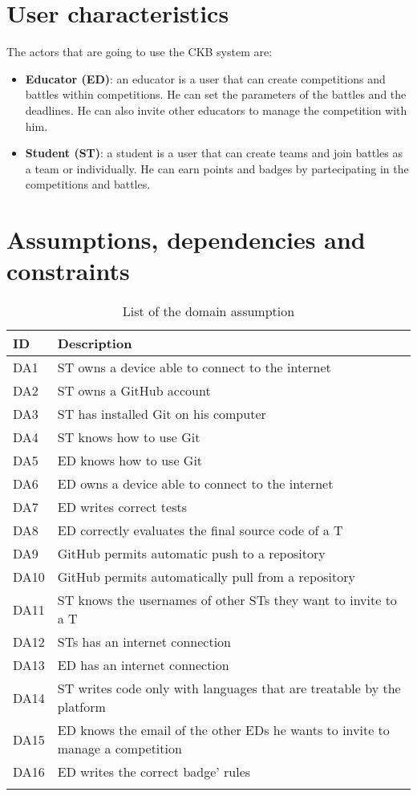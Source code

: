 \newpage

\section{User characteristics}
\label{s:User_characteristics}%

The actors that are going to use the CKB system are:
\begin{itemize}
  \item \textbf{Educator (ED)}: an educator is a user that can create competitions and battles within competitions. He can set the parameters of the battles and the deadlines. He can also invite other educators to manage the competition with him.
  \item \textbf{Student (ST)}: a student is a user that can create teams and join battles as a team or individually. He can earn points and badges by partecipating in the competitions and battles.
\end{itemize}


\section{Assumptions, dependencies and constraints}
\label{s:Assumptions_dependencies_and_constraints}%

\begin{longtable}{|l|l|}
  \hline
  \textbf{ID} & \textbf{Description}      \\
  \hline
  DA1 & ST owns a device able to connect to the internet \\
  \hline
  DA2 & ST owns a GitHub account \\
  \hline
  DA3 & ST has installed Git on his computer \\
  \hline
  DA4 & ST knows how to use Git \\
  \hline
  DA5 & ED knows how to use Git \\
  \hline
  DA6 & ED owns a device able to connect to the internet \\
  \hline
  DA7 & ED writes correct tests \\ 
  \hline
  DA8 & ED correctly evaluates the final source code of a T \\
  \hline
  DA9 & GitHub permits automatic push to a repository \\
  \hline
  DA10 & GitHub permits automatically pull from a repository \\
  \hline
  DA11 & ST knows the usernames of other STs they want to invite to a T  \\
  \hline
  DA12 & STs has an internet connection \\
  \hline
  DA13 & ED has an internet connection \\
  \hline
  DA14 & ST writes code only with languages that are treatable by the platform \\
  \hline
  DA15 & ED knows the email of the other EDs he wants to invite to manage a competition \\
  \hline
  DA16 & ED writes the correct badge’ rules \\
  \hline
  \caption{List of the domain assumption}
  \label{tab:domainAssumption}
\end{longtable}